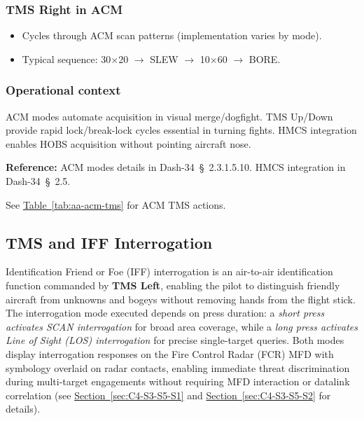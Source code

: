 \documentclass[11pt, a4paper, twoside]{report}
\newcommand{\dashref}[1]{Dash-34~\S~#1}
\newcommand{\secref}[1]{\hyperref[#1]{Section~\ref*{#1}}}
\newcommand{\tabref}[1]{\hyperref[#1]{Table~\ref*{#1}}}
\begin{document}
\subsubsection*{TMS Right in ACM}
\label{sec:C4-S3-S4-S3}

\begin{itemize}[nosep]
    \item Cycles through ACM scan patterns (implementation varies by mode).
    \item Typical sequence: 30$\times$20 $\rightarrow$ SLEW $\rightarrow$ 10$\times$60 $\rightarrow$ BORE.
\end{itemize}

\subsubsection*{Operational context}
\label{sec:C4-S3-S4-S4}

ACM modes automate acquisition in visual merge/dogfight. TMS Up/Down provide 
rapid lock/break-lock cycles essential in turning fights. HMCS integration 
enables HOBS acquisition without pointing aircraft nose.

\textbf{Reference:} ACM modes details in \dashref{2.3.1.5.10}. HMCS 
integration in \dashref{2.5}.

See \tabref{tab:aa-acm-tms} for ACM TMS actions.



\subsection{TMS and IFF Interrogation}
\label{sec:C4-S3-S5}

Identification Friend or Foe (IFF) interrogation is an air-to-air identification function commanded by \textbf{TMS Left}, enabling the pilot to distinguish friendly aircraft from unknowns and bogeys without removing hands from the flight stick. The interrogation mode executed depends on press duration: a \textit{short press activates SCAN interrogation} for broad area coverage, while a \textit{long press activates Line of Sight (LOS) interrogation} for precise single-target queries. Both modes display interrogation responses on the Fire Control Radar (FCR) MFD with symbology overlaid on radar contacts, enabling immediate threat discrimination during multi-target engagements without requiring MFD interaction or datalink correlation (see \secref{sec:C4-S3-S5-S1} and \secref{sec:C4-S3-S5-S2} for details).
\end{document}
